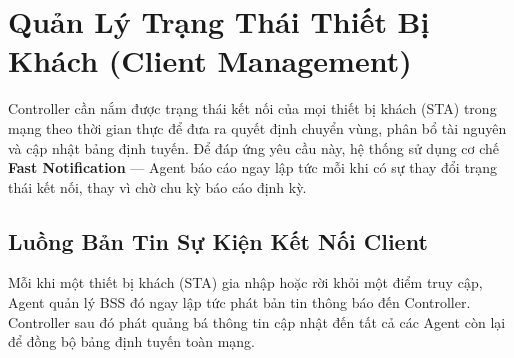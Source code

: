 \section{Quản Lý Trạng Thái Thiết Bị Khách (Client Management)}

Controller cần nắm được trạng thái kết nối của mọi thiết bị khách (STA) trong mạng
theo thời gian thực để đưa ra quyết định chuyển vùng, phân bổ tài nguyên và cập nhật
bảng định tuyến. Để đáp ứng yêu cầu này, hệ thống sử dụng cơ chế
\textbf{Fast Notification} --- Agent báo cáo ngay lập tức mỗi khi có sự thay đổi trạng
thái kết nối, thay vì chờ chu kỳ báo cáo định kỳ.


\subsection{Luồng Bản Tin Sự Kiện Kết Nối Client}

Mỗi khi một thiết bị khách (STA) gia nhập hoặc rời khỏi một điểm truy cập, Agent quản
lý BSS đó ngay lập tức phát bản tin thông báo đến Controller. Controller sau đó phát
quảng bá thông tin cập nhật đến tất cả các Agent còn lại để đồng bộ bảng định tuyến
toàn mạng.

